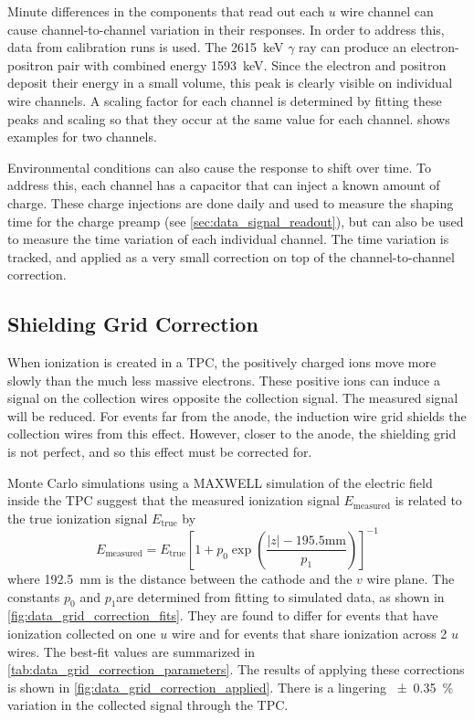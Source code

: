 \documentclass[herrin-thesis.tex]{subfiles}
\begin{document}
Minute differences in the components that read out each \(u\) wire channel can cause channel-to-channel variation in their responses. In order to address this, data from  calibration runs is used. The \SI{2615}{\keV} \(\gamma\) ray can produce an electron-positron pair with combined energy \SI{1593}{\keV}. Since the electron and positron deposit their energy in a small volume, this peak is clearly visible on individual wire channels. A scaling factor for each channel is determined by fitting these peaks and scaling so that they occur at the same value for each channel.  shows examples for two channels.

Environmental conditions can also cause the response to shift over time. To address this, each channel has a capacitor that can inject a known amount of charge. These charge injections are done \about{} daily and used to measure the shaping time for the charge preamp (see \cref{sec:data_signal_readout}), but can also be used to measure the time variation of each individual channel. The time variation is tracked, and applied as a very small correction on top of the channel-to-channel correction.

\subsection{Shielding Grid Correction}
\label{sec:data_grid_correction}
When ionization is created in a TPC, the positively charged ions move more slowly than the much less massive electrons. These positive ions can induce a signal on the collection wires opposite the collection signal. The measured signal will be reduced. For events far from the anode, the induction wire grid shields the collection wires from this effect. However, closer to the anode, the shielding grid is not perfect\cite{Bunemann:1949kx}, and so this effect must be corrected for.

Monte Carlo simulations using a MAXWELL simulation of the electric field inside the TPC suggest that the measured ionization signal \(E_\text{measured}\) is related to the true ionization signal \(E_\text{true}\) by
\begin{equation}
E_\text{measured} = E_\text{true}\left[1 + p_0 \exp \left(\frac{|z| - 195.5\si{\mm}}{p_1}\right)\right]^{-1}
\label{eq:data_grid_correction}
\end{equation}
where \SI{192.5}{\mm} is the distance between the cathode and the \(v\) wire plane. The constants \(p_0\) and \(p_1\)are determined from fitting to simulated data, as shown in \cref{fig:data_grid_correction_fits}. They are found to differ for events that have ionization collected on one \(u\) wire and for events that share ionization across 2 \(u\) wires. The best-fit values are summarized in \cref{tab:data_grid_correction_parameters}. The results of applying these corrections is shown in \cref{fig:data_grid_correction_applied}. There is a lingering \SI{\pm0.35}{\percent} variation in the collected signal through the TPC.
\end{document}
